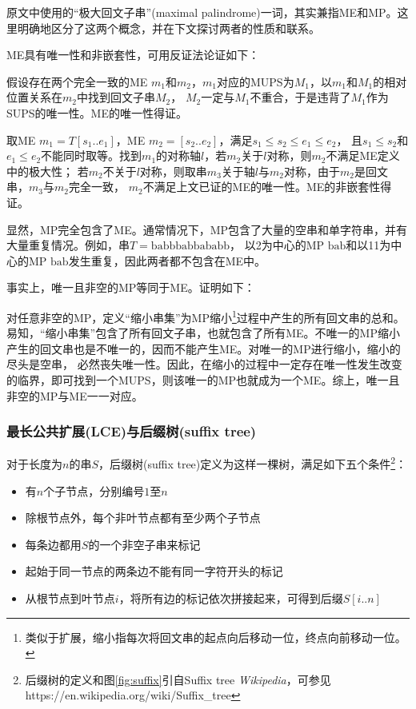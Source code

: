 原文中使用的“极大回文子串”(maximal palindrome)一词，其实兼指ME和MP。这里明确地区分了这两个概念，并在下文探讨两者的性质和联系。

ME具有唯一性和非嵌套性，可用反证法论证如下：

假设存在两个完全一致的ME $m_1$和$m_2$，$m_1$对应的MUPS为$M_1$，以$m_1$和$M_1$的相对位置关系在$m_2$中找到回文子串$M_2$，
$M_2$一定与$M_1$不重合，于是违背了$M_1$作为SUPS的唯一性。ME的唯一性得证。

取ME $m_1 = T[s_1..e_1]$，ME $m_2 = [s_2..e_2]$，满足$s_1 \leq s_2 \leq e_1 \leq e_2 $，
且$s_1 \leq s_2$和$e_1 \leq e_2$不能同时取等。找到$m_1$的对称轴$l$，若$m_2$关于$l$对称，则$m_2$不满足ME定义中的极大性；
若$m_2$不关于$l$对称，则取串$m_3$关于轴$l$与$m_2$对称，由于$m_2$是回文串，$m_3$与$m_2$完全一致，
$m_2$不满足上文已证的ME的唯一性。ME的非嵌套性得证。

显然，MP完全包含了ME。通常情况下，MP包含了大量的空串和单字符串，并有大量重复情况。例如，串$T = \mathrm{babbbabbababb}$，
以2为中心的MP $\mathrm{bab}$和以11为中心的MP $\mathrm{bab}$发生重复，因此两者都不包含在ME中。

事实上，唯一且非空的MP等同于ME。证明如下：

对任意非空的MP，定义“缩小串集”为MP缩小\footnote{类似于扩展，缩小指每次将回文串的起点向后移动一位，终点向前移动一位。}过程中产生的所有回文串的总和。
易知，“缩小串集”包含了所有回文子串，也就包含了所有ME。不唯一的MP缩小产生的回文串也是不唯一的，因而不能产生ME。对唯一的MP进行缩小，缩小的尽头是空串，
必然丧失唯一性。因此，在缩小的过程中一定存在唯一性发生改变的临界，即可找到一个MUPS，则该唯一的MP也就成为一个ME。综上，唯一且非空的MP与ME一一对应。

\subsubsection{最长公共扩展(LCE)与后缀树(suffix tree)}\label{subsubsec:lce}

对于长度为$n$的串$S$，后缀树(suffix tree)定义为这样一棵树，满足如下五个条件\footnote{后缀树的定义和图\ref{fig:suffix}引自Suffix tree \textit{Wikipedia}，可参见https://en.wikipedia.org/wiki/Suffix\_tree}：
\begin{itemize}
    \item 有$n$个子节点，分别编号$1$至$n$
    \item 除根节点外，每个非叶节点都有至少两个子节点
    \item 每条边都用$S$的一个非空子串来标记
    \item 起始于同一节点的两条边不能有同一字符开头的标记
    \item 从根节点到叶节点$i$，将所有边的标记依次拼接起来，可得到后缀$S[i..n]$
\end{itemize}

